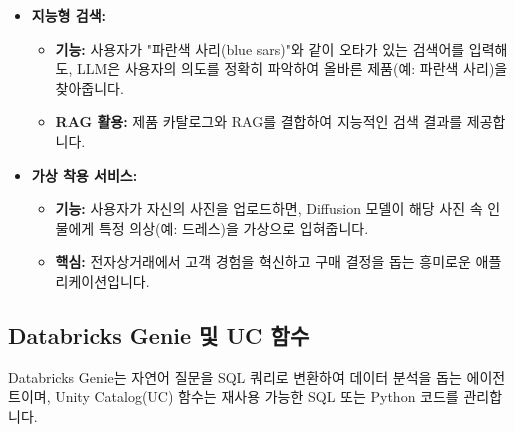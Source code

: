 \documentclass[11pt,a4paper]{article}
\begin{document}
\begin{itemize}
    \item \textbf{지능형 검색:}
    \begin{itemize}
        \item \textbf{기능:} 사용자가 "파란색 사리(blue sars)"와 같이 오타가 있는 검색어를 입력해도, LLM은 사용자의 의도를 정확히 파악하여 올바른 제품(예: 파란색 사리)을 찾아줍니다.
        \item \textbf{RAG 활용:} 제품 카탈로그와 RAG를 결합하여 지능적인 검색 결과를 제공합니다.
    \end{itemize}
    \item \textbf{가상 착용 서비스:}
    \begin{itemize}
        \item \textbf{기능:} 사용자가 자신의 사진을 업로드하면, Diffusion 모델이 해당 사진 속 인물에게 특정 의상(예: 드레스)을 가상으로 입혀줍니다.
        \item \textbf{핵심:} 전자상거래에서 고객 경험을 혁신하고 구매 결정을 돕는 흥미로운 애플리케이션입니다.
    \end{itemize}
\end{itemize}

\subsection{Databricks Genie 및 UC 함수}

Databricks Genie는 자연어 질문을 SQL 쿼리로 변환하여 데이터 분석을 돕는 에이전트이며, Unity Catalog(UC) 함수는 재사용 가능한 SQL 또는 Python 코드를 관리합니다.
\end{document}
